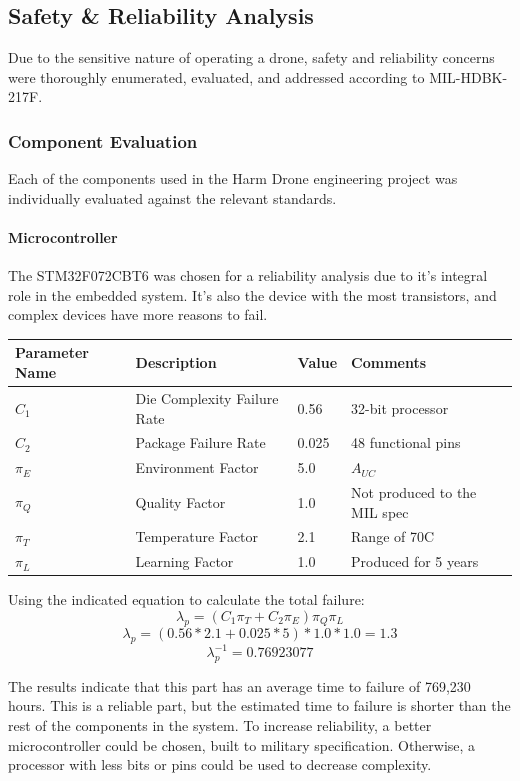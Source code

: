 \documentclass[12pt]{article}
\begin{document}
\subsection{Safety \& Reliability Analysis}
Due to the sensitive nature of operating a drone, safety and reliability concerns were thoroughly enumerated, evaluated, and addressed according to MIL-HDBK-217F.
\subsubsection{Component Evaluation}
Each of the components used in the Harm Drone engineering project was individually evaluated against the relevant standards. 
\paragraph{Microcontroller}
\par The STM32F072CBT6 was chosen for a reliability analysis due to it's integral role in the embedded system. It's also the device with the most transistors, and complex devices have more reasons to fail.
\begin{table}[htbp!]
\centering
\begin{tabular}{|l|l|l|l|}
\hline
Parameter Name & Description & Value & Comments \\ \hline
$C_1$ & Die Complexity Failure Rate & 0.56 & 32-bit processor \\ \hline
$C_2$ &  Package Failure Rate & 0.025 & 48 functional pins \\ \hline
$\pi_E$ & Environment Factor & 5.0 & $A_{UC}$ \\ \hline
$\pi_Q$ & Quality Factor & 1.0 & Not produced to the MIL spec \\ \hline
$\pi_T$ & Temperature Factor & 2.1 & Range of 70C \\ \hline
$\pi_L$ & Learning Factor & 1.0 & Produced for 5 years \\ \hline
\end{tabular}
\end{table}
\par Using the indicated equation to calculate the total failure:
\[ \lambda_p = (C_1\pi_T + C_2\pi_E) \pi_Q \pi_L\]
\[ \lambda_p = (0.56*2.1 + 0.025*5) * 1.0 * 1.0 = 1.3\]
\[ \lambda_p^{-1} = 0.76923077 \]
\par The results indicate that this part has an average time to failure of 769,230 hours. This is a reliable part, but the estimated time to failure is shorter than the rest of the components in the system. To increase reliability, a better microcontroller could be chosen, built to military specification. Otherwise, a processor with less bits or pins could be used to decrease complexity.
\end{document}
